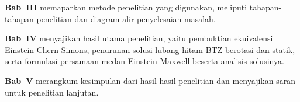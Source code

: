 \vspace{0.3em}
\noindent\textbf{Bab~III} memaparkan metode penelitian yang digunakan, meliputi tahapan-tahapan penelitian dan diagram alir penyelesaian masalah.

\vspace{0.3em}
\noindent\textbf{Bab~IV} menyajikan hasil utama penelitian, yaitu pembuktian ekuivalensi Einstein-Chern-Simons, penurunan solusi lubang hitam BTZ berotasi dan statik, serta formulasi persamaan medan Einstein-Maxwell beserta analisis solusinya.

\vspace{0.3em}
\noindent\textbf{Bab~V} merangkum kesimpulan dari hasil-hasil penelitian dan menyajikan saran untuk penelitian lanjutan.
